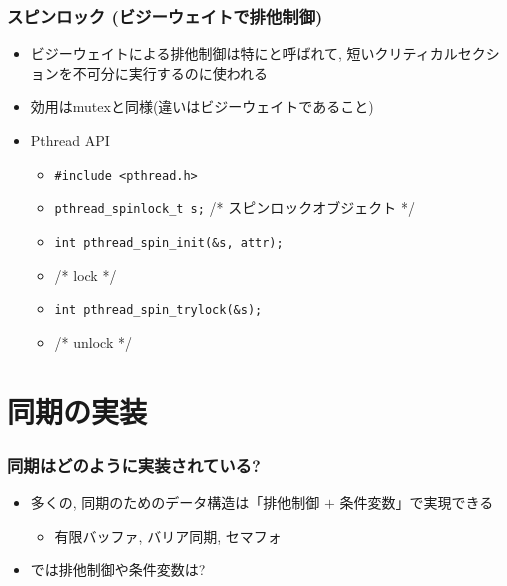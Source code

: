 \documentclass[12pt,dvipdfmx]{beamer}
\begin{document}
\begin{frame}
  \frametitle{スピンロック (ビジーウェイトで排他制御)}
  \begin{itemize}
  \item ビジーウェイトによる排他制御は特にと呼ばれて,
    短いクリティカルセクションを不可分に実行するのに使われる
  \item 効用はmutexと同様(違いはビジーウェイトであること)
  \item Pthread API
    \begin{itemize}
    \item {\tt \#include <pthread.h>}
    \item {\tt pthread\_spinlock\_t s;} /* スピンロックオブジェクト */
    \item {\tt int pthread\_spin\_init(\&s, attr);}
    \item {} /* lock */
    \item {\tt int pthread\_spin\_trylock(\&s);}
    \item {} /* unlock */
    \end{itemize}
  \end{itemize}
\end{frame}

\section{同期の実装}
\begin{frame}[fragile]
  \frametitle{同期はどのように実装されている?}
  \begin{itemize}
  \item 多くの, 同期のためのデータ構造は「排他制御 $+$ 条件変数」で実現できる
    \begin{itemize}
    \item 有限バッファ, バリア同期, セマフォ
    \end{itemize}
  \item では排他制御や条件変数は?
  \end{itemize}
\end{frame}
\end{document}
